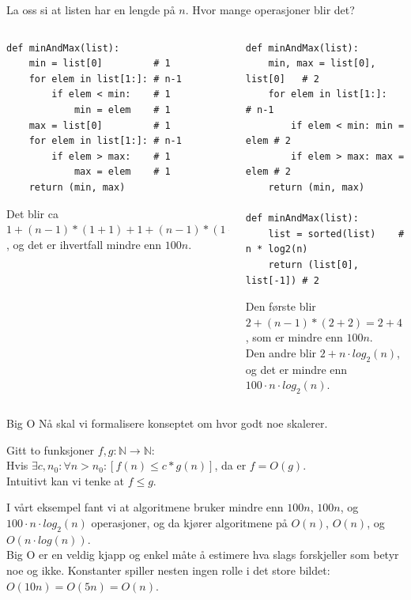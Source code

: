 \begin{frame}[fragile]{}
    La oss si at listen har en lengde på $n$. Hvor mange operasjoner blir det?
    \begin{columns}
        \begin{column}{0.45\textwidth}
            \begin{verbatim}
def minAndMax(list):
    min = list[0]         # 1
    for elem in list[1:]: # n-1
        if elem < min:    # 1
            min = elem    # 1
    max = list[0]         # 1
    for elem in list[1:]: # n-1
        if elem > max:    # 1
            max = elem    # 1
    return (min, max)
            \end{verbatim}
            Det blir ca $1 + (n-1)*(1+1) + 1 + (n-1)*(1+1) = 2 + 4*(n-1) = 4n-2$, og det er ihvertfall mindre enn \underline{$100n$}.
        \end{column}
        \pause
        \begin{column}{0.45\textwidth}
            \begin{verbatim}
def minAndMax(list):              
    min, max = list[0], list[0]   # 2
    for elem in list[1:]:         # n-1
        if elem < min: min = elem # 2
        if elem > max: max = elem # 2
    return (min, max)
    
def minAndMax(list):
    list = sorted(list)    # n * log2(n)
    return (list[0], list[-1]) # 2
            \end{verbatim}
            Den første blir $2+(n-1)*(2+2) = 2+4(n-1) = 4n-2$, som er mindre enn \underline{$100n$}.\\
            \pause
            Den andre blir $2 + n \cdot log_2(n)$, og det er mindre enn \underline{$100 \cdot n \cdot log_2(n)$}.
        \end{column}
    \end{columns}
\end{frame}

\begin{frame}{Big O}
    Nå skal vi formalisere konseptet om hvor godt noe skalerer.
    \begin{definition}[Big O]
        Gitt to funksjoner $f, g : \mathbb{N} \rightarrow \mathbb{N}$: \\
        Hvis $\exists c, n_0 : \forall n > n_0 : [ f(n) \leq c*g(n) ]$, da er $f = O(g)$.\\
        Intuitivt kan vi tenke at $f \leq g$.
    \end{definition}
    \pause
    I vårt eksempel fant vi at algoritmene bruker mindre enn $100n$, $100n$, og $100 \cdot n \cdot log_2(n)$ operasjoner, og da kjører algoritmene på $O(n)$, $O(n)$, og $O(n \cdot log(n))$.\\[2mm]
    Big O er en veldig kjapp og enkel måte å estimere hva slags forskjeller som betyr noe og ikke. Konstanter spiller nesten ingen rolle i det store bildet: $O(10n) = O(5n) = O(n)$.
\end{frame}

